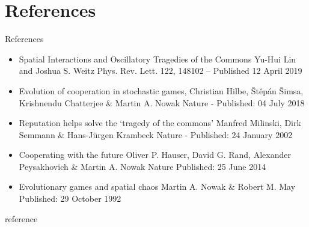 \documentclass{beamer}
\begin{document}
\section{References}
\begin{frame}{References}
    \begin{itemize}
        \item Spatial Interactions and Oscillatory Tragedies of the Commons
        Yu-Hui Lin and Joshua S. Weitz
        Phys. Rev. Lett. 122, 148102 – Published 12 April 2019
        \item Evolution of cooperation in stochastic games, Christian Hilbe, Štěpán Šimsa, Krishnendu Chatterjee \& Martin A. Nowak 
        Nature - Published: 04 July 2018
        \item Reputation helps solve the ‘tragedy of the commons’
        Manfred Milinski, Dirk Semmann \& Hans-Jürgen Krambeck Nature - Published: 24 January 2002
        \item Cooperating with the future
        Oliver P. Hauser, David G. Rand, Alexander Peysakhovich \& Martin A. Nowak Nature Published: 25 June 2014
        \item Evolutionary games and spatial chaos
        Martin A. Nowak \& Robert M. May Published: 29 October 1992
    \end{itemize}
\end{frame}
\begin{frame}{reference}
    
\end{frame}
\end{document}
